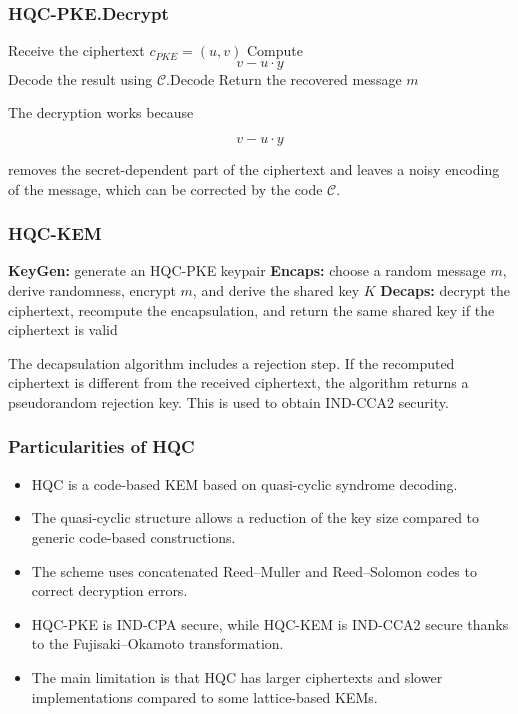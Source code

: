 \subsubsection*{HQC-PKE.Decrypt}

\begin{algorithm}
\begin{algorithmic}[1]
    \State Receive the ciphertext \(c_{PKE} = (u,v)\)
    \State Compute
    \[
        v - u \cdot y
    \]
    \State Decode the result using \(\mathcal{C}.\text{Decode}\)
    \State Return the recovered message \(m\)
\end{algorithmic}
\end{algorithm}

\noindent
The decryption works because

\[
v - u \cdot y
\]

\noindent
removes the secret-dependent part of the ciphertext and leaves a noisy encoding of the message, which can be corrected by the code \(\mathcal{C}\).

\subsubsection*{HQC-KEM}

\begin{algorithm}
\begin{algorithmic}[1]
    \State \textbf{KeyGen:} generate an HQC-PKE keypair
    \State \textbf{Encaps:} choose a random message \(m\), derive randomness, encrypt \(m\), and derive the shared key \(K\)
    \State \textbf{Decaps:} decrypt the ciphertext, recompute the encapsulation, and return the same shared key if the ciphertext is valid
\end{algorithmic}
\end{algorithm}

\noindent
The decapsulation algorithm includes a rejection step. If the recomputed ciphertext is different from the received ciphertext, the algorithm returns a pseudorandom rejection key. This is used to obtain IND-CCA2 security.

\subsubsection{Particularities of HQC}

\begin{itemize}
    \item HQC is a code-based KEM based on quasi-cyclic syndrome decoding.
    \item The quasi-cyclic structure allows a reduction of the key size compared to 
    generic code-based constructions.
    \item The scheme uses concatenated Reed--Muller and Reed--Solomon codes to 
    correct decryption errors.
    \item HQC-PKE is IND-CPA secure, while HQC-KEM is IND-CCA2 secure thanks to 
    the Fujisaki--Okamoto transformation.
    \item The main limitation is that HQC has larger ciphertexts and slower 
    implementations compared to some lattice-based KEMs.
\end{itemize}

